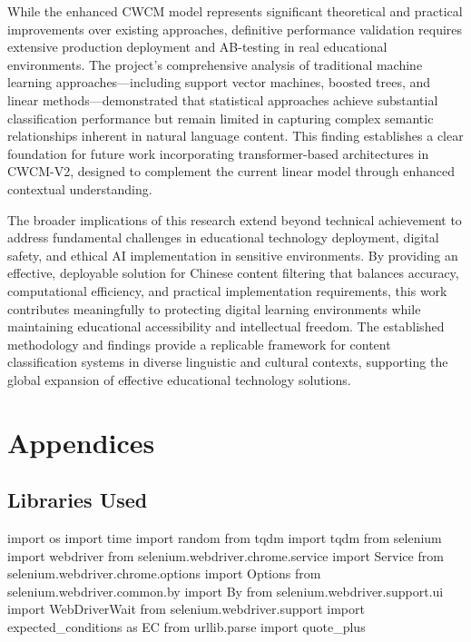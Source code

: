 \documentclass[
  titlepage]{article}
\begin{document}
While the enhanced CWCM model represents significant theoretical and
practical improvements over existing approaches, definitive performance
validation requires extensive production deployment and AB-testing in
real educational environments. The project's comprehensive analysis of
traditional machine learning approaches---including support vector
machines, boosted trees, and linear methods---demonstrated that
statistical approaches achieve substantial classification performance
but remain limited in capturing complex semantic relationships inherent
in natural language content. This finding establishes a clear foundation
for future work incorporating transformer-based architectures in
CWCM-V2, designed to complement the current linear model through
enhanced contextual understanding.

The broader implications of this research extend beyond technical
achievement to address fundamental challenges in educational technology
deployment, digital safety, and ethical AI implementation in sensitive
environments. By providing an effective, deployable solution for Chinese
content filtering that balances accuracy, computational efficiency, and
practical implementation requirements, this work contributes
meaningfully to protecting digital learning environments while
maintaining educational accessibility and intellectual freedom. The
established methodology and findings provide a replicable framework for
content classification systems in diverse linguistic and cultural
contexts, supporting the global expansion of effective educational
technology solutions.

\section*{Appendices}\label{appendices}

\subsection{Libraries Used}\label{libraries-used}

import os import time import random from tqdm import tqdm from selenium
import webdriver from selenium.webdriver.chrome.service import Service
from selenium.webdriver.chrome.options import Options from
selenium.webdriver.common.by import By from
selenium.webdriver.support.ui import WebDriverWait from
selenium.webdriver.support import expected\_conditions as EC from
urllib.parse import quote\_plus
\end{document}
